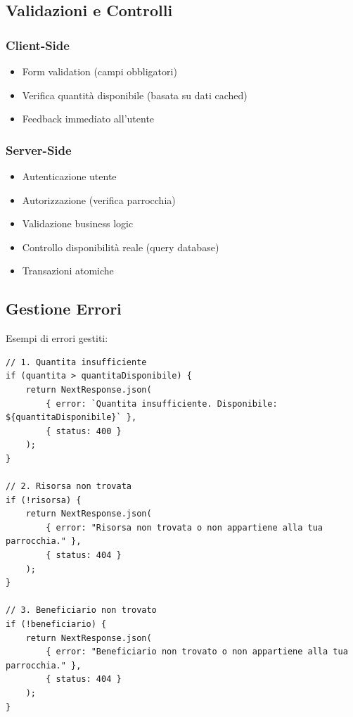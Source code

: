 \documentclass{article}
\begin{document}
\subsection{Validazioni e Controlli}

\subsubsection{Client-Side}
\begin{itemize}
\item Form validation (campi obbligatori)
\item Verifica quantità disponibile (basata su dati cached)
\item Feedback immediato all'utente
\end{itemize}

\subsubsection{Server-Side}
\begin{itemize}
\item Autenticazione utente
\item Autorizzazione (verifica parrocchia)
\item Validazione business logic
\item Controllo disponibilità reale (query database)
\item Transazioni atomiche
\end{itemize}

\subsection{Gestione Errori}

Esempi di errori gestiti:

\begin{lstlisting}
// 1. Quantita insufficiente
if (quantita > quantitaDisponibile) {
    return NextResponse.json(
        { error: `Quantita insufficiente. Disponibile: ${quantitaDisponibile}` },
        { status: 400 }
    );
}

// 2. Risorsa non trovata
if (!risorsa) {
    return NextResponse.json(
        { error: "Risorsa non trovata o non appartiene alla tua parrocchia." },
        { status: 404 }
    );
}

// 3. Beneficiario non trovato
if (!beneficiario) {
    return NextResponse.json(
        { error: "Beneficiario non trovato o non appartiene alla tua parrocchia." },
        { status: 404 }
    );
}
\end{lstlisting}
\end{document}

